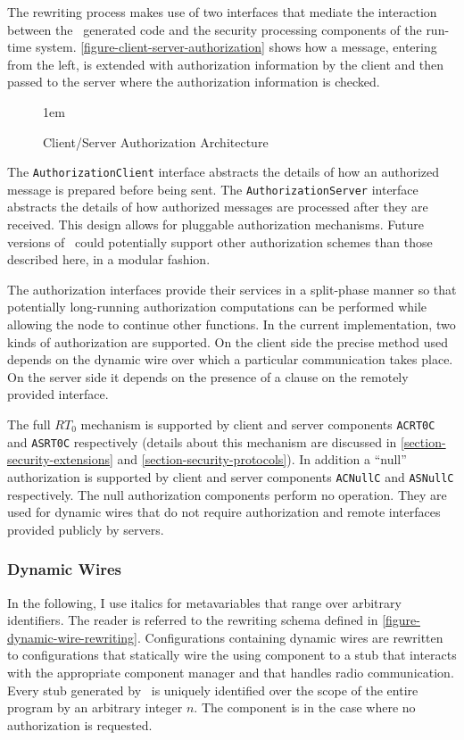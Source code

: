 The rewriting process makes use of two interfaces that mediate the interaction between the
\Sprocket\ generated code and the security processing components of the run-time system.
\autoref{figure-client-server-authorization} shows how a message, entering from the left, is
extended with authorization information by the client and then passed to the server where the
authorization information is checked.

\begin{figure}[htbp]
  
  \centerline{\raise 1em\box\graph}
  \caption{Client/Server Authorization Architecture}
  \label{figure-client-server-authorization}
\end{figure}

The \texttt{AuthorizationClient} interface abstracts the details of how an authorized message is
prepared before being sent. The \texttt{AuthorizationServer} interface abstracts the details of
how authorized messages are processed after they are received. This design allows for pluggable
authorization mechanisms. Future versions of \Sprocket\ could potentially support other
authorization schemes than those described here, in a modular fashion.

The authorization interfaces provide their services in a split-phase manner so that potentially
long-running authorization computations can be performed while allowing the node to continue
other functions. In the current implementation, two kinds of authorization are supported. On the
client side the precise method used depends on the dynamic wire over which a particular
communication takes place. On the server side it depends on the presence of a 
clause on the remotely provided interface.

The full $RT_0$ mechanism is supported by client and server components \texttt{ACRT0C} and
\texttt{ASRT0C} respectively (details about this mechanism are discussed in
\autoref{section-security-extensions} and \autoref{section-security-protocols}). In addition a
``null'' authorization is supported by client and server components \texttt{ACNullC} and
\texttt{ASNullC} respectively. The null authorization components perform no operation. They are
used for dynamic wires that do not require authorization and remote interfaces provided publicly
by servers.

\subsubsection{Dynamic Wires} In the following, I use italics for metavariables that range over
arbitrary identifiers. The reader is referred to the rewriting schema defined in
\autoref{figure-dynamic-wire-rewriting}. Configurations containing dynamic wires are rewritten
to configurations that statically wire the using component  to a stub
 that interacts with the appropriate component manager
 and that handles radio communication. Every stub generated by
\Sprocket\ is uniquely identified over the scope of the entire program by an arbitrary integer
$n$. The  component is  in the case where no
authorization is requested.

